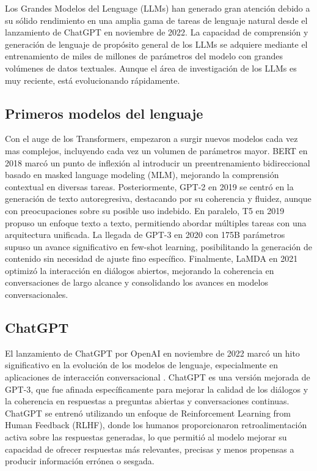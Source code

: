 Los Grandes Modelos del Lenguage (LLMs) han generado gran atención debido a su sólido rendimiento en una amplia gama de tareas de lenguaje natural desde el lanzamiento de ChatGPT en noviembre de 2022. 
La capacidad de comprensión y generación de lenguaje de propósito general de los LLMs se adquiere mediante el entrenamiento de miles de millones de parámetros del modelo con grandes volúmenes de datos textuales. 
Aunque el área de investigación de los LLMs es muy reciente, está evolucionando rápidamente.

\subsection{Primeros modelos del lenguaje}
Con el auge de los Transformers, empezaron a surgir nuevos modelos cada vez mas complejos, incluyendo cada vez un volumen de parámetros mayor.
BERT en 2018 marcó un punto de inflexión al introducir un preentrenamiento bidireccional basado en masked language modeling (MLM), mejorando la comprensión contextual en diversas tareas. 
Posteriormente, GPT-2 en 2019 \cite{radford2019language} se centró en la generación de texto autoregresiva, destacando por su coherencia y fluidez, aunque con preocupaciones sobre su posible uso indebido. 
En paralelo, T5 en 2019 \cite{raffel2023exploringlimitstransferlearning} propuso un enfoque texto a texto, permitiendo abordar múltiples tareas con una arquitectura unificada. 
La llegada de GPT-3 en 2020 \cite{brown2020languagemodelsfewshotlearners} con 175B parámetros supuso un avance significativo en few-shot learning, posibilitando la generación de contenido sin necesidad de ajuste fino específico. 
Finalmente, LaMDA en 2021 \cite{thoppilan2022lamdalanguagemodelsdialog} optimizó la interacción en diálogos abiertos, mejorando la coherencia en conversaciones de largo alcance y consolidando los avances en modelos conversacionales. 


\subsection{ChatGPT}
El lanzamiento de ChatGPT por OpenAI en noviembre de 2022 marcó un hito significativo en la evolución de los modelos de lenguaje, especialmente en aplicaciones de interacción conversacional \cite{Liu_2023}. 
ChatGPT es una versión mejorada de GPT-3, que fue afinada específicamente para mejorar la calidad de los diálogos y la coherencia en respuestas a preguntas abiertas y conversaciones continuas. 
ChatGPT se entrenó utilizando un enfoque de Reinforcement Learning from Human Feedback (RLHF), donde los humanos proporcionaron retroalimentación activa sobre las respuestas generadas, lo que permitió al modelo mejorar su capacidad de ofrecer respuestas más relevantes, precisas y menos propensas a producir información errónea o sesgada.


